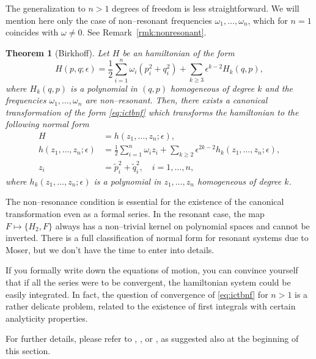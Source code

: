\documentclass[english,fontsize=11pt,paper=b5]{scrbook}
\newtheorem{theorem}{Theorem}[chapter]
\theoremstyle{definition}
\begin{document}
      The generalization to $n>1$ degrees of freedom is less straightforward. We will mention here only the case of non--resonant frequencies $\omega_1,\ldots,\omega_n$, which for $n=1$ coincides with $\omega \neq 0$. See Remark~\ref{rmk:nonresonant}.

      \begin{theorem}[Birkhoff]
        Let $H$ be an hamiltonian of the form
        \begin{equation}
          H(p,q; \epsilon) = \frac12 \sum_{i=1}^n \omega_i(p_i^2 + q_i^2) + \sum_{k\geq 3} \epsilon^{k-2} H_k(q,p),
        \end{equation}
        where $H_k(q,p)$ is a polynomial in $(q,p)$ homogeneous of degree $k$ and the frequencies $\omega_1,\ldots,\omega_n$ are non--resonant.
        Then, there exists a canonical transformation of the form \eqref{eq:ictbnf} which transforms the hamiltonian to the following normal form
        \begin{align}
          H                          & = h(z_1, \ldots, z_n; \epsilon),                                                                      \\
          h(z_1,\ldots,z_n;\epsilon) & = \frac12 \sum_{i=1}^n \omega_i z_i + \sum_{k\geq 2} \epsilon^{2k-2} h_k(z_1, \ldots, z_n; \epsilon), \\
          z_i                        & = \widetilde p_i^2 + \widetilde q_i^2,\quad i=1,\ldots,n,
        \end{align}
        where $h_k(z_1, \ldots, z_n; \epsilon)$ is a polynomial in $z_1, \ldots, z_n$ homogeneous of degree $k$.
      \end{theorem}

      The non--resonance condition is essential for the existence of the canonical transformation even as a formal series. In the resonant case, the map $F \mapsto \big\{H_2, F\big\}$ always has a non--trivial kernel on polynomial spaces and cannot be inverted.
      There is a full classification of normal form for resonant systems due to Moser, but we don't have the time to enter into details.

      If you formally write down the equations of motion, you can convince yourself that if all the series were to be convergent, the hamiltonian system could be easily integrated.
      In fact, the question of convergence of \eqref{eq:ictbnf} for $n>1$ is a rather delicate problem, related to the existence of first integrals with certain analyticity properties.

      For further details, please refer to \cite{Broer_2009}, \cite[Chapter 6.5]{book:celletti}, \cite[Chapter 8.3]{book:arnoldcelestial} or \cite[Chapters 15.2 and 15.3]{book:knauf}, as suggested also at the beginning of this section.
\end{document}
